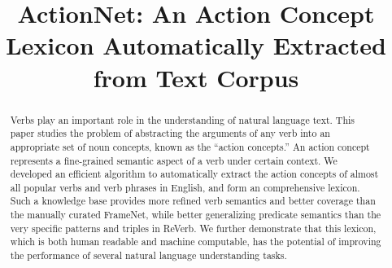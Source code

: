 \documentclass{sig-alternate}%
\begin{document}
\title{ActionNet: An Action Concept Lexicon Automatically Extracted from Text Corpus}

%


\maketitle
\begin{abstract}
Verbs play an important role in the understanding of natural
language text. This paper studies the problem of abstracting 
the arguments of any verb into an appropriate set of noun 
concepts, known as the ``action concepts.'' 
An action concept represents a fine-grained semantic aspect of 
a verb under certain context. We developed an efficient algorithm
to automatically extract the action concepts of almost all popular 
verbs and verb phrases in English, and form an comprehensive
lexicon. Such a knowledge base provides more refined 
verb semantics and better coverage than the manually curated
FrameNet, while better generalizing predicate semantics than
the very specific patterns and triples in ReVerb.
We further demonstrate that this lexicon, which is both human readable
and machine computable, has the potential of improving the performance
of several natural language understanding tasks.
\end{abstract}
\end{document}
